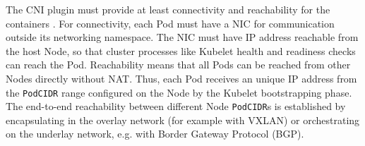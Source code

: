 \documentclass[english, 12pt, a4paper, sci, utf8, a-2b, online]{aaltothesis}
\begin{document}

The CNI plugin must provide at least connectivity and reachability for the containers \cite{cni-tkng}. For connectivity, each Pod must have a NIC for communication outside its networking namespace. The NIC must have IP address reachable from the host Node, so that cluster processes like Kubelet health and readiness checks can reach the Pod. Reachability means that all Pods can be reached from other Nodes directly without NAT. Thus, each Pod receives an unique IP address from the \texttt{PodCIDR} range configured on the Node by the Kubelet bootstrapping phase. The end-to-end reachability between different Node \texttt{PodCIDR}s is established by encapsulating in the overlay network (for example with VXLAN) or orchestrating on the underlay network, e.g. with Border Gateway Protocol (BGP).

\end{document}
